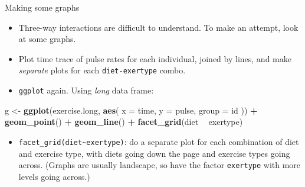 \documentclass[ignorenonframetext,]{beamer}
\newenvironment{Shaded}{\begin{snugshade}}{\end{snugshade}}
\newcommand{\DataTypeTok}[1]{\textcolor[rgb]{0.13,0.29,0.53}{#1}}
\newcommand{\KeywordTok}[1]{\textcolor[rgb]{0.13,0.29,0.53}{\textbf{#1}}}
\newcommand{\NormalTok}[1]{#1}
\newcommand{\OperatorTok}[1]{\textcolor[rgb]{0.81,0.36,0.00}{\textbf{#1}}}
\newcommand{\StringTok}[1]{\textcolor[rgb]{0.31,0.60,0.02}{#1}}
\providecommand{\tightlist}{%
  \setlength{\itemsep}{0pt}\setlength{\parskip}{0pt}}
\begin{document}
\begin{frame}[fragile]{Making some graphs}
\protect\hypertarget{making-some-graphs}{}

\begin{itemize}
\item
  Three-way interactions are difficult to understand. To make an
  attempt, look at some graphs.
\item
  Plot time trace of pulse rates for each individual, joined by lines,
  and make \emph{separate} plots for each \texttt{diet-exertype} combo.
\item
  \texttt{ggplot} again. Using \emph{long} data frame:
\end{itemize}

\begin{Shaded}
\begin{Highlighting}[]
\NormalTok{g <-}\StringTok{ }\KeywordTok{ggplot}\NormalTok{(exercise.long, }\KeywordTok{aes}\NormalTok{(}
  \DataTypeTok{x =}\NormalTok{ time, }\DataTypeTok{y =}\NormalTok{ pulse,}
  \DataTypeTok{group =}\NormalTok{ id}
\NormalTok{)) }\OperatorTok{+}\StringTok{ }\KeywordTok{geom_point}\NormalTok{() }\OperatorTok{+}\StringTok{ }\KeywordTok{geom_line}\NormalTok{() }\OperatorTok{+}
\StringTok{  }\KeywordTok{facet_grid}\NormalTok{(diet }\OperatorTok{~}\StringTok{ }\NormalTok{exertype)}
\end{Highlighting}
\end{Shaded}

\begin{itemize}
\tightlist
\item
  \texttt{facet\_grid(diet\textasciitilde{}exertype)}: do a separate
  plot for each combination of diet and exercise type, with diets going
  down the page and exercise types going across. (Graphs are usually
  landscape, so have the factor \texttt{exertype} with more levels going
  across.)
\end{itemize}

\end{frame}
\end{document}
